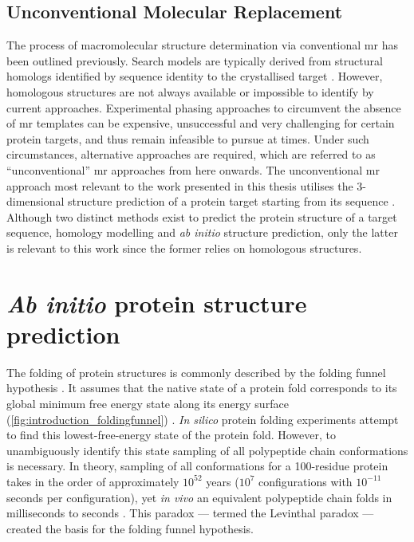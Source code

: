 \subsection{Unconventional Molecular Replacement}
The process of macromolecular structure determination via conventional \gls{mr} has been outlined previously. Search models are typically derived from structural homologs identified by sequence identity to the crystallised target \cite{Rupp2010-nc}. However, homologous structures are not always available or impossible to identify by current approaches. Experimental phasing approaches to circumvent the absence of \gls{mr} templates can be expensive, unsuccessful and very challenging for certain protein targets, and thus remain infeasible to pursue at times. Under such circumstances, alternative approaches are required, which are referred to as ``unconventional'' \gls{mr} approaches from here onwards. The unconventional \gls{mr} approach most relevant to the work presented in this thesis utilises the 3-dimensional structure prediction of a protein target starting from its sequence \cite{Qian2007-vo,Rigden2008-vo,Das2009-uz}. Although two distinct methods exist to predict the protein structure of a target sequence, homology modelling and \textit{ab initio} structure prediction, only the latter is relevant to this work since the former relies on homologous structures.
 
%
%

\section{\textit{Ab initio} protein structure prediction} \label{sec:introduction_structure_prediction}
The folding of protein structures is commonly described by the folding funnel hypothesis \cite{Leopold1992-yf}. It assumes that the native state of a protein fold corresponds to its global minimum free energy state along its energy surface (\cref{fig:introduction_foldingfunnel}) \cite{Anfinsen1973-in}. \textit{In silico} protein folding experiments attempt to find this lowest-free-energy state of the protein fold. However, to unambiguously identify this state sampling of all polypeptide chain conformations is necessary. In theory, sampling of all conformations for a 100-residue protein takes in the order of approximately $10^{52}$ years ($10^7$ configurations with $10^{-11}$ seconds per configuration), yet \textit{in vivo} an equivalent polypeptide chain folds in milliseconds to seconds \cite{Levinthal1969-bn,Karplus2011-jh}. This paradox --- termed the Levinthal paradox \cite{Levinthal1969-bn} --- created the basis for the folding funnel hypothesis.  

